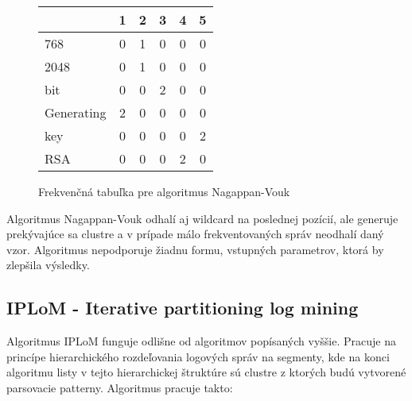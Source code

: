 \begin{figure}[htbp]
\centering
\begin{minipage}{0.9\textwidth}
\centering
\begin{tabularx}{175px}{ | X | c | c | c | c | c | }
\hline
           & 1 & 2 & 3 & 4 & 5 \\ \hline
768        & 0 & 1 & 0 & 0 & 0 \\ \hline
2048       & 0 & 1 & 0 & 0 & 0 \\ \hline
bit        & 0 & 0 & 2 & 0 & 0 \\ \hline
Generating & 2 & 0 & 0 & 0 & 0 \\ \hline
key        & 0 & 0 & 0 & 0 & 2 \\ \hline
RSA        & 0 & 0 & 0 & 2 & 0 \\ \hline
\end{tabularx}
\end{minipage}
\caption{Frekvenčná tabuľka pre algoritmus Nagappan-Vouk}
\label{fig:nagappan}
\end{figure}

Algoritmus Nagappan-Vouk odhalí aj wildcard na poslednej pozícií, ale generuje prekývajúce sa clustre a v prípade málo frekventovaných správ neodhalí daný vzor. Algoritmus nepodporuje žiadnu formu, vstupných parametrov, ktorá by zlepšila výsledky.

\subsection{IPLoM - Iterative partitioning log mining}
Algoritmus IPLoM \parencite{iplom}  funguje odlišne od algoritmov popísaných vyššie. Pracuje na princípe hierarchického rozdeľovania logových správ na segmenty, kde na konci algoritmu listy v tejto hierarchickej štruktúre sú clustre z ktorých budú vytvorené parsovacie patterny. Algoritmus pracuje takto:

